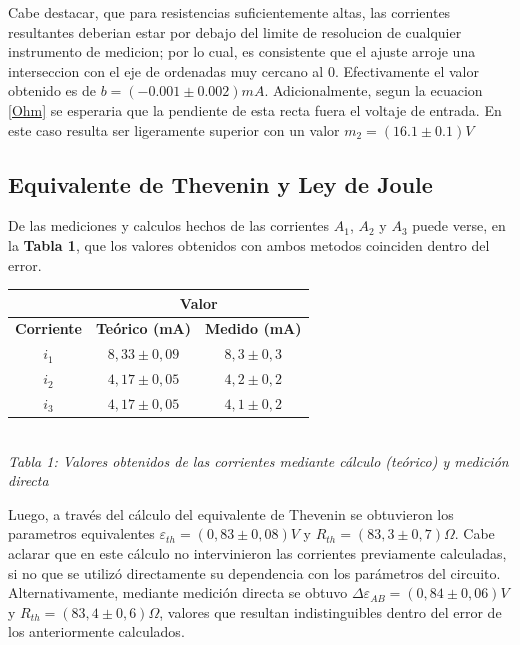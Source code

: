 \documentclass[11pt,a4paper]{article}
\begin{document}
 Cabe destacar, que para resistencias suficientemente altas, las corrientes resultantes deberian estar por debajo del limite de resolucion de cualquier instrumento de medicion; por lo cual, es consistente que el ajuste arroje una interseccion con el eje de ordenadas muy cercano al 0. Efectivamente el valor obtenido es de $b = (-0.001 \pm 0.002)mA$. Adicionalmente, segun la ecuacion \eqref{Ohm} se esperaria que la pendiente de esta recta fuera el voltaje de entrada. En este caso resulta ser ligeramente superior con un valor $m_2 = (16.1\pm0.1)V$

\subsection{Equivalente de Thevenin y Ley de Joule}

 
De las mediciones y calculos hechos de las corrientes $A_1$, $A_2$ y $A_3$ puede verse, en la \textbf{Tabla 1}, que los valores obtenidos con ambos metodos coinciden dentro del error. 

\begin{center}
\begin{tabular}{||c|c|c||}
\hline
& \multicolumn{2}{c||}{\textbf{Valor}} \\ \hline
\textbf{Corriente} & \textbf{Teórico (mA)} & \textbf{Medido (mA)} \\ \hline 
$i_1$ & $8,33\pm0,09$ & $8,3\pm0,3$ \\ \hline 
$i_2$ & $4,17\pm0,05$ & $4,2\pm0,2$ \\ \hline 
$i_3$ & $4,17\pm0,05$ & $4,1\pm0,2$ \\ \hline 
\end{tabular}\\

\textit{Tabla 1: Valores obtenidos de las corrientes mediante cálculo (teórico) y medición directa}
\end{center}

Luego, a través del cálculo del equivalente de Thevenin se obtuvieron los parametros equivalentes $\varepsilon_{th} = (0,83\pm0,08)V$ y $R_{th} = (83,3 \pm 0,7) \Omega$. Cabe aclarar que en este cálculo no intervinieron las corrientes previamente calculadas, si no que se utilizó directamente su dependencia con los parámetros del circuito. Alternativamente, mediante medición directa se obtuvo $\Delta\varepsilon_{AB} = (0,84 \pm 0,06)V$ y $R_{th} = (83,4 \pm 0,6)\Omega$, valores que resultan indistinguibles dentro del error de los anteriormente calculados. 
\end{document}

